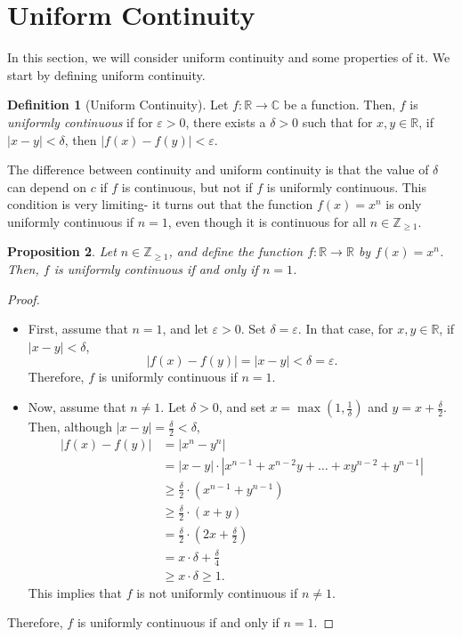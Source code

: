 \documentclass[a4paper, openany]{memoir}
\theoremstyle{definition}
\newtheorem{definition}{Definition}[section]
\theoremstyle{plain}
\newtheorem{proposition}[definition]{Proposition}
\begin{document}
\newpage

\section{Uniform Continuity}
In this section, we will consider uniform continuity and some properties of it. We start by defining uniform continuity.
\begin{definition}[Uniform Continuity]
Let $f: \mathbb{R} \to \mathbb{C}$ be a function. Then, $f$ is \emph{uniformly continuous} if for $\varepsilon > 0$, there exists a $\delta > 0$ such that for $x, y \in \mathbb{R}$, if $|x - y| < \delta$, then $|f(x) - f(y)| < \varepsilon$.
\end{definition}
\noindent The difference between continuity and uniform continuity is that the value of $\delta$ can depend on $c$ if $f$ is continuous, but not if $f$ is uniformly continuous. This condition is very limiting- it turns out that the function $f(x) = x^n$ is only uniformly continuous if $n = 1$, even though it is continuous for all $n \in \mathbb{Z}_{\geqslant 1}$.
\begin{proposition}
Let $n \in \mathbb{Z}_{\geqslant 1}$, and define the function $f: \mathbb{R} \to \mathbb{R}$ by $f(x) = x^n$. Then, $f$ is uniformly continuous if and only if $n = 1$.
\end{proposition}
\begin{proof}
\hspace*{0pt}
\begin{itemize}
    \item First, assume that $n = 1$, and let $\varepsilon > 0$. Set $\delta = \varepsilon$. In that case, for $x, y \in \mathbb{R}$, if $|x - y| < \delta$,
    \[|f(x) - f(y)| = |x - y| < \delta = \varepsilon.\]
    Therefore, $f$ is uniformly continuous if $n = 1$.
    
    \item Now, assume that $n \neq 1$. Let $\delta > 0$, and set $x = \max(1, \frac{1}{\delta})$ and $y = x + \frac{\delta}{2}$. Then, although $|x - y| = \frac{\delta}{2} < \delta$, 
    \begin{align*}
        |f(x) - f(y)| &= |x^n - y^n| \\
        &= |x - y| \cdot |x^{n-1} + x^{n-2}y + \dots + xy^{n-2} + y^{n-1}| \\
        &\geqslant \frac{\delta}{2} \cdot (x^{n-1} + y^{n-1}) \\
        &\geqslant \frac{\delta}{2} \cdot (x + y) \\
        &= \frac{\delta}{2} \cdot \left(2x + \frac{\delta}{2}\right) \\
        &= x \cdot \delta + \frac{\delta}{4} \\
        &\geqslant x \cdot \delta \geqslant 1.
    \end{align*}
    This implies that $f$ is not uniformly continuous if $n \neq 1$.
\end{itemize}
Therefore, $f$ is uniformly continuous if and only if $n = 1$.
\end{proof}
\end{document}
